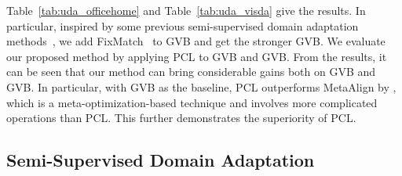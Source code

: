 Table~\ref{tab:uda_officehome} and Table~\ref{tab:uda_visda} give the results.
In particular, inspired by some previous semi-supervised domain adaptation methods~\cite{li2021cdac,li2021ecacl}, we add FixMatch~\cite{fixmatch} to GVB and get the stronger GVB. We evaluate our proposed method by applying PCL to GVB and GVB.
From the results, it can be seen that our method can bring considerable gains both on GVB and GVB. In particular, with GVB as the baseline, PCL outperforms MetaAlign by , which  is a meta-optimization-based technique and involves more complicated operations than PCL. This further demonstrates the superiority of PCL.

\subsection{Semi-Supervised Domain Adaptation}
\label{app:rssda}



